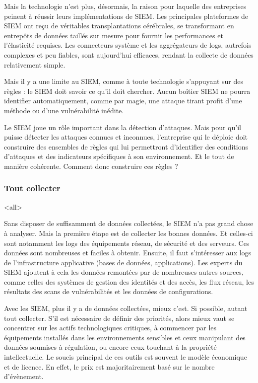 Mais la technologie n’est plus, désormais, la raison pour laquelle des entreprises peinent à réussir leurs implémentations de SIEM. Les principales plateformes de SIEM ont reçu de véritables transplantations cérébrales, se transformant en entrepôts de données taillés sur mesure pour fournir les performances et l’élasticité requises. Les connecteurs système et les aggrégateurs de logs, autrefois complexes et peu fiables, sont aujourd’hui efficaces, rendant la collecte de données relativement simple.

Mais il y a une limite au SIEM, comme à toute technologie s’appuyant sur des règles : le SIEM doit savoir ce qu’il doit chercher. Aucun boîtier SIEM ne pourra identifier automatiquement, comme par magie, une attaque tirant profit d’une méthode ou d’une vulnérabilité inédite.

Le SIEM joue un rôle important dans la détection d’attaques. Mais pour qu’il puisse détecter les attaques connues et inconnues, l’entreprise qui le déploie doit construire des ensembles de règles qui lui permettront d’identifier des conditions d’attaques et des indicateurs spécifiques à son environnement. Et le tout de manière cohérente. Comment donc construire ces règles ?

\subsubsection{Tout collecter}

\mode<all>{}

Sans disposer de suffisamment de données collectées, le SIEM n’a pas grand chose à analyser. Mais la première étape est de collecter les bonnes données. Et celles-ci sont notamment les logs des équipements réseau, de sécurité  et des serveurs. Ces données sont nombreuses et faciles à obtenir. Ensuite, il faut s’intéresser aux logs de l’infrastructure applicative (bases de données, applications). Les experts du SIEM ajoutent à cela les données remontées par de nombreuses autres sources, comme celles des systèmes de gestion des identités et des accès, les flux réseau, les résultats des scans de vulnérabilités et les données de configurations.

Avec les SIEM, plus il y a de données collectées, mieux c’est. Si possible, autant tout collecter. S’il est nécessaire de définir des priorités, alors mieux vaut se concentrer sur les actifs technologiques critiques, à commencer par les équipements installés dans les environnements sensibles et ceux manipulant des données soumises à régulation, ou encore ceux touchant à la propriété intellectuelle. Le soucis principal de ces outils est souvent le modèle économique et de licence. En effet, le prix est majoritairement basé sur le nombre d'évènement.


